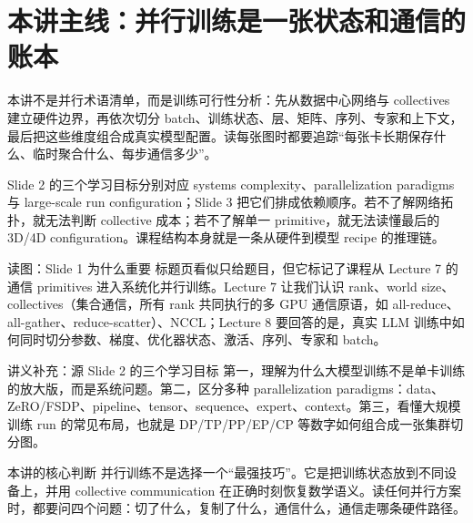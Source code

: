 \section{本讲主线：并行训练是一张状态和通信的账本}

本讲不是并行术语清单，而是训练可行性分析：先从数据中心网络与 collectives 建立硬件边界，再依次切分 batch、训练状态、层、矩阵、序列、专家和上下文，最后把这些维度组合成真实模型配置。读每张图时都要追踪“每张卡长期保存什么、临时聚合什么、每步通信多少”。


Slide 2 的三个学习目标分别对应 systems complexity、parallelization paradigms 与 large-scale run configuration；Slide 3 把它们排成依赖顺序。若不了解网络拓扑，就无法判断 collective 成本；若不了解单一 primitive，就无法读懂最后的 3D/4D configuration。课程结构本身就是一条从硬件到模型 recipe 的推理链。

\begin{knowledgebox}{读图：Slide 1 为什么重要}
标题页看似只给题目，但它标记了课程从 Lecture 7 的通信 primitives 进入系统化并行训练。Lecture 7 让我们认识 rank、world size、collectives（集合通信，所有 rank 共同执行的多 GPU 通信原语，如 all-reduce、all-gather、reduce-scatter）、NCCL；Lecture 8 要回答的是，真实 LLM 训练中如何同时切分参数、梯度、优化器状态、激活、序列、专家和 batch。
\end{knowledgebox}


\begin{knowledgebox}{讲义补充：源 Slide 2 的三个学习目标}
第一，理解为什么大模型训练不是单卡训练的放大版，而是系统问题。第二，区分多种 parallelization paradigms：data、ZeRO/FSDP、pipeline、tensor、sequence、expert、context。第三，看懂大规模训练 run 的常见布局，也就是 DP/TP/PP/EP/CP 等数字如何组合成一张集群切分图。
\end{knowledgebox}


\begin{importantbox}{本讲的核心判断}
并行训练不是选择一个“最强技巧”。它是把训练状态放到不同设备上，并用 collective communication 在正确时刻恢复数学语义。读任何并行方案时，都要问四个问题：切了什么，复制了什么，通信什么，通信走哪条硬件路径。
\end{importantbox}

